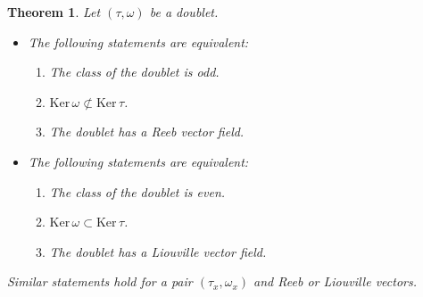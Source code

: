 \documentclass[11pt,twoside]{article}
\theoremstyle{plain}
\newtheorem{theorem}{Theorem}[section]
\theoremstyle{definition}
\def\Ker{\mathrm{Ker \,}}
\begin{document}
\begin{theorem}
\label{thm:class-parity}
Let $(\tau,\omega)$ be a doublet.
\begin{itemize}
\item 
The following statements are equivalent:
\begin{enumerate}[$(i)$]
\item 
The class of the doublet is odd.
\item 
$\Ker \omega \not\subset \Ker\tau$.
\item 
The doublet has a Reeb vector field.
\end{enumerate}
\item 
The following statements are equivalent:
\begin{enumerate}[$(i)$]
\item 
The class of the doublet is even.
\item 
$\Ker \omega \subset \Ker \tau$.
\item 
The doublet has a Liouville vector field.
\end{enumerate}
\end{itemize}
Similar statements hold for a pair $(\tau_x,\omega_x)$
and Reeb or Liouville vectors.
\end{theorem}
\end{document}
